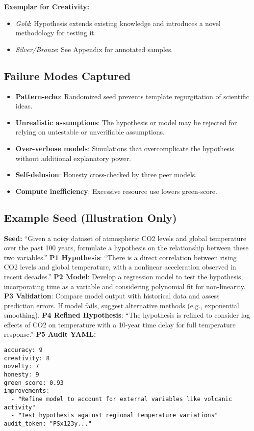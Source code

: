 \textbf{Exemplar for Creativity:}
\begin{itemize}
  \item \emph{Gold}: Hypothesis extends existing knowledge and introduces a novel methodology for testing it.
  \item \emph{Silver/Bronze}: See Appendix for annotated samples.
\end{itemize}

\subsection*{Failure Modes Captured}
\begin{itemize}
  \item \textbf{Pattern-echo}: Randomized seed prevents template regurgitation of scientific ideas.
  \item \textbf{Unrealistic assumptions}: The hypothesis or model may be rejected for relying on untestable or unverifiable assumptions.
  \item \textbf{Over-verbose models}: Simulations that overcomplicate the hypothesis without additional explanatory power.
  \item \textbf{Self-delusion}: Honesty cross-checked by three peer models.
  \item \textbf{Compute inefficiency}: Excessive resource use lowers green-score.
\end{itemize}

\subsection*{Example Seed (Illustration Only)}
\textbf{Seed:} “Given a noisy dataset of atmospheric CO2 levels and global temperature over the past 100 years, formulate a hypothesis on the relationship between these two variables.”  
\textbf{P1 Hypothesis}: “There is a direct correlation between rising CO2 levels and global temperature, with a nonlinear acceleration observed in recent decades.”  
\textbf{P2 Model}: Develop a regression model to test the hypothesis, incorporating time as a variable and considering polynomial fit for non-linearity.  
\textbf{P3 Validation}: Compare model output with historical data and assess prediction errors. If model fails, suggest alternative methods (e.g., exponential smoothing).  
\textbf{P4 Refined Hypothesis}: “The hypothesis is refined to consider lag effects of CO2 on temperature with a 10-year time delay for full temperature response.”  
\textbf{P5 Audit YAML:}
\begin{verbatim}
accuracy: 9
creativity: 8
novelty: 7
honesty: 9
green_score: 0.93
improvements:
  - "Refine model to account for external variables like volcanic activity"
  - "Test hypothesis against regional temperature variations"
audit_token: "PSx123y..."
\end{verbatim}